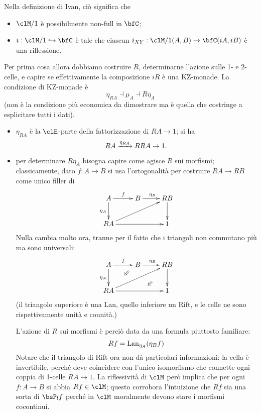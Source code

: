 \documentclass{amsart}
\begin{document}
Nella definizione di Ivan, ciò significa che 
\begin{itemize}
  \item $\clM/1$ è possibilmente non-full in $\bfC$;
  \item $i : \clM/1 \hookrightarrow \bfC$ è tale che ciascun $i_{XY} : \clM/1(A,B) \to \bfC(iA,iB)$ è una riflessione. 
\end{itemize}
Per prima cosa allora dobbiamo costruire $R$, determinarne l'azione sulle 1- e  2-celle, e capire se effettivamente la composizione $iR$ è una KZ-monade. La condizione di KZ-monade è
\[\eta_{RA}\dashv \mu_A \dashv R\eta_A\]
(non è la condizione più economica da dimostrare ma è quella che costringe a esplicitare tutti i dati).
\begin{itemize}
  \item $\eta_{RA}$ è la $\clE$-parte della fattorizzazione di $RA\to 1$; si ha 
  \[RA \xrightarrow{\eta_{RA}} RRA \to 1.\]
  \item per determinare $R\eta_A$ bisogna capire come agisce $R$ sui morfismi; classicamente, dato $f : A \to B$ si usa l'ortogonalità per costruire $RA \to RB$ come unico filler di 
  \[
  \xymatrix{
    A \ar[r]^f \ar[d]_{\eta_A} & B \ar[r]^{\eta_B} & RB \ar[d]\\
    RA \ar[rr] \ar[urr]&& 1
  }  
  \] 
  Nulla cambia molto ora, tranne per il fatto che i triangoli non commutano più ma sono universali:
  \[
  \xymatrix{
    A\ar@{}[drr]|(.3)\Swarrow\ar@{}[drr]|(.7)\Swarrow \ar[r]^f \ar[d]_{\eta_A} & B \ar[r]^{\eta_B} & RB \ar[d]\\
    RA \ar[rr] \ar[urr]&& 1
  }  
  \] 
  (il triangolo superiore è una Lan, quello inferiore un Rift, e le celle ne sono rispettivamente unità e counità.)

  L'azione di $R$ sui morfismi è perciò data da una formula piuttosto familiare:
  \[Rf = \mathrm{Lan}_{\eta_A}(\eta_B f)\]
  Notare che il triangolo di Rift ora non dà particolari informazioni: la cella è invertibile, perché deve coincidere con l'unico isomorfismo che connette ogni coppia di 1-celle $RA\to 1$. La riflessività di $\clM$ però implica che per ogni $f : A \to B$ si abbia $Rf \in\clM$; questo corrobora l'intuizione che $Rf$ sia una sorta di $\bsP_! f$ perché in $\clM$ moralmente devono stare i morfismi cocontinui. 
  

\end{itemize}
\end{document}
